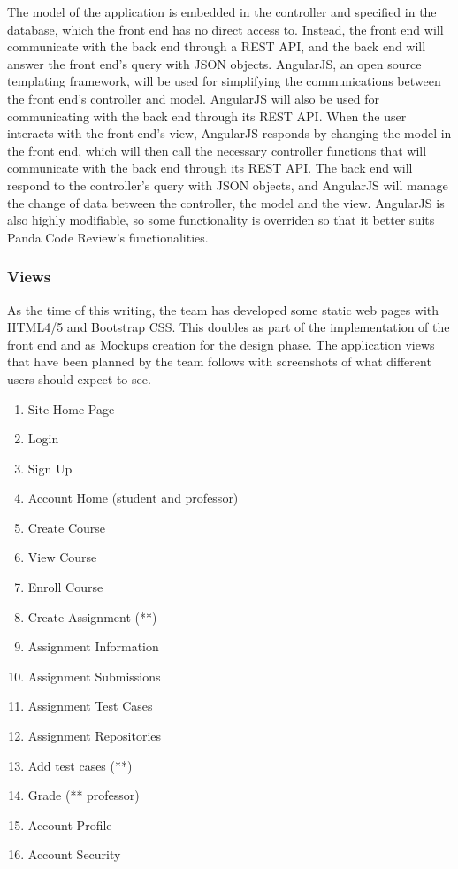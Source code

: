 The model of the application is embedded in the controller and specified in the
database, which the front end has no direct access to. Instead, the front end
will communicate with the back end through a REST API, and the back end will
answer the front end's query with JSON objects. AngularJS, an open source
templating framework, will be used for simplifying the communications between
the front end's controller and model. AngularJS will also be used for
communicating with the back end through its REST API. When the user interacts
with the front end's view, AngularJS responds by changing the model in the front
end, which will then call the necessary controller functions that will
communicate with the back end through its REST API. The back end will respond to
the controller's query with JSON objects, and AngularJS will manage the change
of data between the controller, the model and the view. AngularJS is also highly
modifiable, so some functionality is overriden so that it better suits Panda
Code Review's functionalities.

\subsubsection{Views}
As the time of this writing, the team has developed some static web pages with
HTML4/5 and Bootstrap CSS. This doubles as part of the implementation of the
front end and as Mockups creation for the design phase. The application views
that have been planned by the team follows with screenshots of what different
users should expect to see.

\begin{enumerate}
\item Site Home Page
\item Login
\item Sign Up
\item Account Home (student and professor)
\item Create Course
\item View Course
\item Enroll Course
\item Create Assignment (**) %
\item Assignment Information
\item Assignment Submissions
\item Assignment Test Cases
\item Assignment Repositories
\item Add test cases (**)
\item Grade (** professor)
\item Account Profile
\item Account Security


\end{enumerate}

